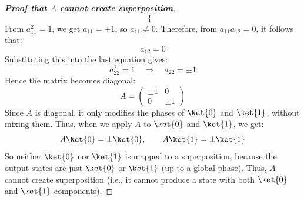 \begin{proof}[\textbf{Proof that $A$ cannot create superposition}]
\begin{equation*}
\begin{cases}
        \end{cases}
    \end{equation*}
    From $a_{11}^{2}=1$, we get $a_{11}=\pm 1$, so $a_{11}\neq 0$. Therefore, from $a_{11}a_{12}=0$, it follows that:
    \begin{equation*}
        a_{12}=0
    \end{equation*}
    Substituting this into the last equation gives:
    \begin{equation*}
        a_{22}^{2}=1
        \quad \Rightarrow \quad
        a_{22}=\pm 1
    \end{equation*}
    Hence the matrix becomes diagonal:
    \begin{equation*}
        A =
        \begin{pmatrix}
            \pm 1 & 0 \\
            0 & \pm 1
        \end{pmatrix}
    \end{equation*}
    Since $A$ is diagonal, it only modifies the phases of $\ket{0}$ and $\ket{1}$, without mixing them. Thus, when we apply $A$ to $\ket{0}$ and $\ket{1}$, we get:
    \begin{equation*}
        A\ket{0} = \pm \ket{0},
        \qquad
        A\ket{1} = \pm \ket{1}
    \end{equation*}
    So neither $\ket{0}$ nor $\ket{1}$ is mapped to a superposition, because the output states are just $\ket{0}$ or $\ket{1}$ (up to a global phase). Thus, $A$ cannot create superposition (i.e., it cannot produce a state with both $\ket{0}$ and $\ket{1}$ components).
\end{proof}